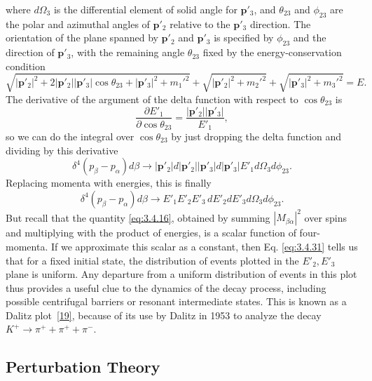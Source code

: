 where $d\Omega_3$ is the differential element of solid angle for $\mathbf{p}'_3$, and $\theta_{23}$
and $\phi_{23}$ are the polar and azimuthal angles of $\mathbf{p}'_2$ relative to the
$\mathbf{p}'_3$ direction. The orientation of the plane spanned by $\mathbf{p}'_2$ and
$\mathbf{p}'_3$ is specified by $\phi_{23}$ and the direction of $\mathbf{p}'_3$, with the
remaining angle $\theta_{23}$ fixed by the energy-conservation condition
\[
 \sqrt{|\mathbf{p}'_2|^2+2|\mathbf{p}'_2||\mathbf{p}'_3|\cos\theta_{23}
 +|\mathbf{p}'_3|^2+m_1'^2}
 +\sqrt{|\mathbf{p}'_2|^2+m_2'^2}+\sqrt{|\mathbf{p}'_3|^2+m_3'^2}=E.
\]
The derivative of the argument of the delta function with respect to $\cos\theta_{23}$ is
\[
 \frac{\partial E'_1}{\partial\cos\theta_{23}}
 =\frac{|\mathbf{p}'_2||\mathbf{p}'_3|}{E'_1},
\]
so we can do the integral over $\cos\theta_{23}$ by just dropping the delta function and
dividing by this derivative
\[
 \delta^4(p_\beta-p_\alpha)d\beta\longrightarrow
 |\mathbf{p}'_2|d|\mathbf{p}'_2||\mathbf{p}'_3|d|\mathbf{p}'_3|
 E'_1d\Omega_3d\phi_{23}.
\]
Replacing momenta with energies, this is finally
\begin{equation}
 \delta^4(p_\beta-p_\alpha)d\beta\longrightarrow
 E'_1E'_2E'_3\,dE'_2dE'_3d\Omega_3d\phi_{23}.
 \tag{3.4.31}\label{eq:3.4.31}
\end{equation}
But recall that the quantity \eqref{eq:3.4.16}, obtained by summing $|M_{\beta\alpha}|^2$ over spins and
multiplying with the product of energies, is a scalar function of four-momenta. If we approximate
this scalar as a constant, then Eq. \eqref{eq:3.4.31} tells us that for a fixed initial state, the
distribution of events plotted in the $E'_2,E'_3$ plane is uniform. Any departure from a uniform
distribution of events in this plot thus provides a useful clue to the dynamics of the decay
process, including possible centrifugal barriers or resonant intermediate states. This is known
as a Dalitz plot~\hyperref[ref:3.19]{[19]}, because of its use by Dalitz in 1953 to analyze the decay
$K^+\to\pi^++\pi^++\pi^-$.

\subsection{Perturbation Theory}

